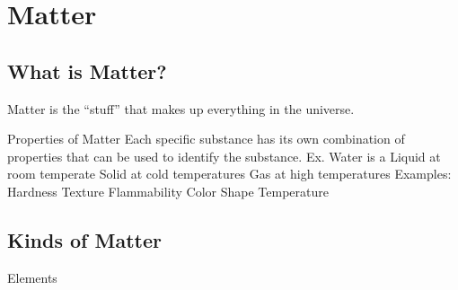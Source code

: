 \documentclass[../../main.tex]{subfiles}
\begin{document}
\chapter{Matter}

\section{What is Matter?}
\begin{outline}[enumerate]
    \1 \colorbox{dracPink}{Matter is the “stuff” that makes up everything in the universe.}


    \1 Properties of Matter
    \2 Each specific substance has its own combination of properties that can be used to identify the substance.
    \2 
    \3 Ex. Water is a
    \4 Liquid at room temperate
    \4 Solid at cold temperatures
    \4 Gas at high temperatures
    \2 Examples:
    \3 Hardness
    \3 Texture
    \3 Flammability
    \3 Color
    \3 Shape
    \3 Temperature

    \newpage


    \section{Kinds of Matter}

    

    \1 Elements



\end{outline}
\end{document}

